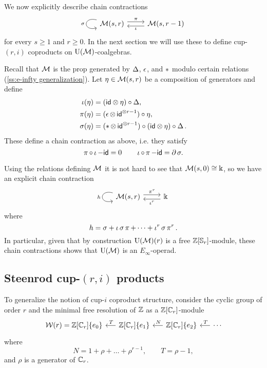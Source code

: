 We now explicitly describe chain contractions
\[
\begin{tikzcd}
\arrow[loop, distance=2em, in=195, out=165, "\sigma"'] \Med(s,r) \arrow[r, shift left=3pt, "\proj"] &
\Med(s,r-1) \arrow[l, shift left=3pt, "\incl"]
\end{tikzcd}
\]
for every $s \geq 1$ and $r \geq 0$.
In the next section we will use these to define cup-$(r, i)$ coproducts on $\operatorname{\mathrm{U}(\mathcal{M})}$-coalgebras.

Recall that $\operatorname{\mathcal{M}}$ is the prop generated by $\operatorname{\Delta}$, $\operatorname{\epsilon}$, and $\operatorname{\ast}$ modulo certain relations (\cref{ss:e-infty generalization}).
Let $\eta \in \operatorname{\mathcal{M}}(s,r)$ be a composition of generators and define
\begin{align*}
\operatorname{\iota}(\eta) & = (\mathsf{id} \otimes \eta) \circ \operatorname{\Delta}, \\
\operatorname{\pi}(\eta) & = (\operatorname{\epsilon} \otimes \, \mathsf{id}^{\otimes r-1}) \circ \eta, \\
\sigma(\eta) & = (\operatorname{\ast} \otimes \, \mathsf{id}^{\otimes r-1}) \circ (\mathsf{id} \otimes \eta) \circ \operatorname{\Delta}.
\end{align*}
These define a chain contraction as above, i.e. they satisfy
\[
\operatorname{\pi} \circ \operatorname{\iota} - \mathsf{id} = 0
\qquad
\operatorname{\iota} \circ \operatorname{\pi} - \mathsf{id} = \operatorname{\partial} \sigma.
\]

Using the relations defining $\operatorname{\mathcal{M}}$ it is not hard to see that $\operatorname{\mathcal{M}}(s,0) \cong \Bbbk$, so we have an explicit chain contraction
\[
\begin{tikzcd}
\arrow[loop, distance=2em, in=195, out=165, "h"'] \Med(s,r) \arrow[r, shift left=3pt, "\proj^r"] &
\k \arrow[l, shift left=3pt, "\incl^r"]
\end{tikzcd}
\]
where
\begin{equation} \label{e:big chain contraction}
h = \sigma + \operatorname{\iota} \sigma \operatorname{\pi} + \dots + \operatorname{\iota}^{r} \sigma \operatorname{\pi}^{r}.
\end{equation}
In particular, given that by construction $\operatorname{\mathrm{U}(\mathcal{M})}(r)$ is a free $\mathbb{Z}[\mathbb{S}_r]$-module, these chain contractions shows that $\operatorname{\mathrm{U}(\mathcal{M})}$ is an $E_\infty$-operad.

\subsection{Steenrod cup-$(r,i)$ products} \label{ss:higher cup-i coproducts}

To generalize the notion of cup-$i$ coproduct structure, consider the cyclic group of order $r$ and the minimal free resolution of $\mathbb{Z}$ as a $\mathbb{Z}[\mathbb{C}_r]$-module
\begin{equation} \label{e:minimal resolution r>2}
\begin{tikzcd} [column sep = .5cm]
\mathcal W(r) = \Z[\Cyc_r]\{e_0\} & \arrow[l, "\,T"'] \Z[\Cyc_r]\{e_1\} & \arrow[l, "\,N"'] \Z[\Cyc_r]\{e_2\} & \arrow[l, "\,T"'] \cdots
\end{tikzcd}
\end{equation}
where
\begin{equation} \label{e:transposition and norm maps}
N = 1 + \rho + \dots + \rho^{r-1}, \qquad
T = \rho - 1,
\end{equation}
and $\rho$ is a generator of $\mathbb{C}_r$.

